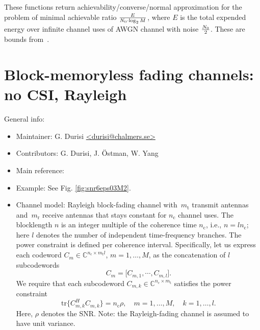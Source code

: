 \documentclass[a4paper,11p]{memoir}
\def\txant{m_{\mathrm{t}}} %
\def\rxant{m_{\mathrm{r}}} %
\def\cohtime{n_{\mathrm{c}}} %
\def\bl{n} %
\def\snr{\rho} %
\def\tfdiv{l}  %
\def\ncod{M}
\begin{document}
These functions return achievability/converse/normal approximation for the problem of minimal achievable ratio ${E\over
N_0 \cdot \log_2 M}$, where $E$ is the total expended energy over infinite channel uses of AWGN channel with noise
$N_0\over 2$.  These are bounds from~\cite[Theorems 2 and 3]{PPV10eneff}.

\chapter{Block-memoryless fading channels: no CSI, Rayleigh}

General info:
\begin{itemize}
  \item Maintainer: G. Durisi \url{<durisi@chalmers.se>}
  
  \item Contributors: G. Durisi, J. \"Ostman, W. Yang

  \item Main reference: \cite{durisi14-12a} 

  \item Example: See Fig. \ref{fig:snr6eps03M2}.
  
  \item Channel model: Rayleigh block-fading channel with~$\txant$ 
  transmit antennas and~$\rxant$ receive antennas that stays constant for
   $\cohtime$ channel uses.
  The blocklength $\bl$ is an integer multiple of the coherence time $\cohtime$, i.e., $\bl=\tfdiv\cohtime$; here $\tfdiv$ denotes the number of independent time-frequency branches. The power constraint is defined per coherence interval. 
  Specifically, let us express each  codeword $C_m \in \mathbb{C}^{\cohtime \times \txant\tfdiv}$, $m=1,\dots,\ncod$, as the concatenation of $l$ subcodewords
    \begin{equation*}
      C_m=\bigl[ C_{m,1}, \cdots, C_{m,l} \bigr].
    \end{equation*}
    We require that each subcodeword $C_{m,k}\in \mathbb{C}^{\cohtime\times\txant}$ satisfies the  power constraint
    \begin{equation*}
      \mathrm{tr}\bigl\{C_{m,k}^H C_{m,k}\bigr\}= \cohtime\snr,\quad m=1,\dots,\ncod,\quad k=1,\dots,\tfdiv. 
    \end{equation*}
    Here, $\snr$ denotes the SNR. Note: the Rayleigh-fading channel is assumed to have unit variance.


\end{itemize}
\end{document}
